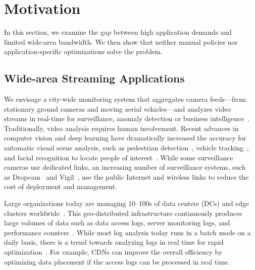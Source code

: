 \section{Motivation}
\label{sec:motivation}

In this section, we examine the gap between high application demands and limited
wide-area bandwidth. We then show that neither manual policies nor
application-specific optimizations solve the problem.

\subsection{Wide-area Streaming Applications}
\label{sec:wide-area-streaming}

 We envisage a city-wide monitoring system that
aggregates camera feeds---from stationary ground cameras and moving aerial
vehicles---and analyzes video streams in real-time for surveillance, anomaly
detection or business intelligence~\cite{oh2011large}. Traditionally, video
analysis requires human involvement. Recent advances in computer vision and deep
learning have dramatically increased the accuracy for automatic visual scene
analysis, such as pedestrian detection~\cite{dollar2012pedestrian}, vehicle
tracking~\cite{coifman1998real}, and facial recognition to locate people of
interest~\cite{Lu:2015:SHF:2888116.2888245, parkhi2015deep}. While some
surveillance cameras use dedicated links, an increasing number of surveillance
systems, such as Dropcam~\cite{dropcam} and Vigil~\cite{zhang2015design}, use
the public Internet and wireless links to reduce the cost of deployment and
management.


 Large organizations today are managing
10--100s of data centers (DCs) and edge clusters
worldwide~\cite{calder2013mapping}. This geo-distributed infrastructure
continuously produces large volumes of data such as data access logs, server
monitoring logs, and performance counters~\cite{alspaugh2014analyzing,
  pu2015low, vulimiri2015global}. While most log analysis today runs in a batch
mode on a daily basis, there is a trend towards analyzing logs in real time for
rapid optimization~\cite{rabkin2014aggregation}. For example, CDNs can improve
the overall efficiency by optimizing data placement if the access logs can be
processed in real time. 


